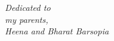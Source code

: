 
\begin{center}
\doublespacing
\vspace*{\fill}
{\Large{\textit{Dedicated to}\\\textit{my parents,\\
Heena and Bharat Barsopia}}}
\vspace*{\fill}
\end{center}


